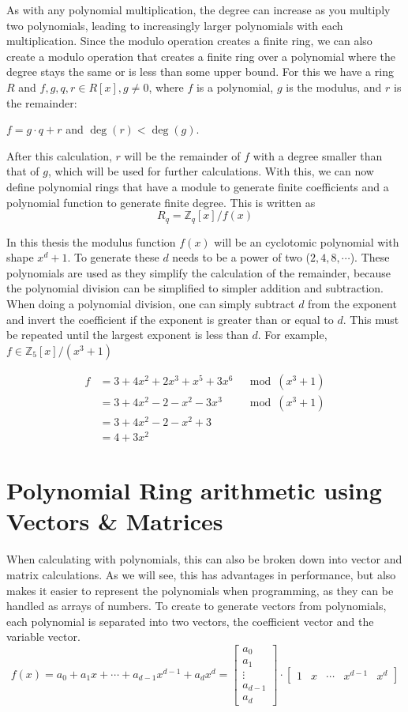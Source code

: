 As with any polynomial multiplication, the degree can increase as you multiply two polynomials, leading to increasingly larger polynomials with each multiplication. Since the modulo operation creates a finite ring, we can also create a modulo operation that creates a finite ring over a polynomial where the degree stays the same or is less than some upper bound. For this we have a ring $R$ and $f, g, q, r \in R[x], g\neq 0$, where $f$ is a polynomial, $g$ is the modulus, and $r$ is the remainder:
\begin{center}
  $f = g\cdot q + r $ and $\deg(r)<\deg(g)$.
\end{center}

After this calculation, $r$ will be the remainder of $f$ with a degree smaller than that of $g$, which will be used for further calculations. With this, we can now define polynomial rings that have a module to generate finite coefficients and a polynomial function to generate finite degree. This is written as 
$$R_q = \mathbb{Z}_q[x]/f(x)$$


In this thesis the modulus function $f(x)$ will be an cyclotomic polynomial with shape $x^d+1$. To generate these $d$ needs to be a power of two ($2,4,8, \cdots$). These polynomials are used as they simplify the calculation of the remainder, because the polynomial division can be simplified to simpler addition and subtraction. When doing a polynomial division, one can simply subtract $d$ from the exponent and invert the coefficient if the exponent is greater than or equal to $d$. This must be repeated until the largest exponent is less than $d$. For example, $f \in \mathbb{Z}_5[x]/(x^3+1)$

\begin{align*}
  f & = 3+4x^2+2x^3+x^5+3x^6 & \mod (x^3+1) \\
    & = 3+4x^2-2-x^2-3x^3    & \mod (x^3+1) \\
    & = 3+4x^2-2-x^2+3                      \\
    & = 4+3x^2
\end{align*}

\section{Polynomial Ring arithmetic using Vectors \& Matrices}
\label{sec:PolyMulMath}

When calculating with polynomials, this can also be broken down into vector and matrix calculations. As we will see, this has advantages in performance, but also makes it easier to represent the polynomials when programming, as they can be handled as arrays of numbers. To create to generate vectors from polynomials, each polynomial is separated into two vectors, the coefficient vector and the variable vector.
$$
  f(x) = a_0+ a_1x+\cdots+ a_{d-1}x^{d-1}+a_dx^d =
  \begin{bmatrix}a_0\\a_1\\ \vdots \\a_{d-1}\\a_d \end{bmatrix}
  \cdot
  \begin{bmatrix}1 & x & \cdots & x^{d-1} &  x^d \end{bmatrix}
$$

